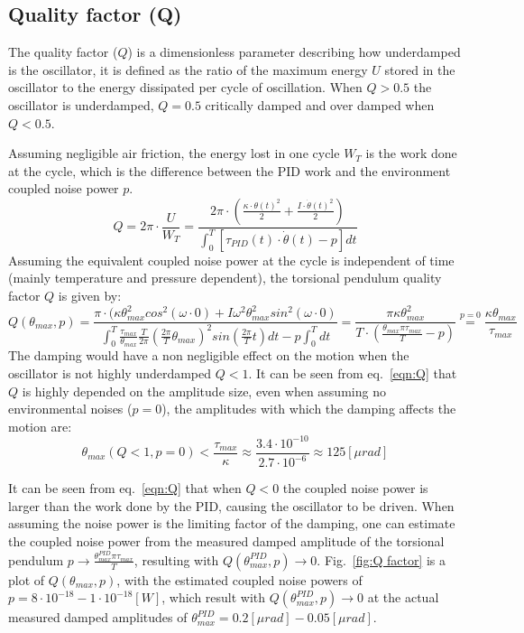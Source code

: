 \documentclass[\main/master.tex]{subfiles}
\begin{document}
\subsection{Quality factor (Q)}
The quality factor ($Q$) is a dimensionless parameter describing how underdamped is the oscillator, it is defined as the ratio of the maximum energy $U$ stored in the oscillator to the energy dissipated per cycle of oscillation. When $Q > 0.5$ the oscillator is underdamped, $Q = 0.5$ critically damped and over damped when $Q < 0.5$.
\par\noindent
Assuming negligible air friction, the energy lost in one cycle  $W_T$ is the work done at the cycle, which is the difference between the PID work and the environment coupled noise power $p$. 
\begin{equation}
Q = 2\pi\cdot \frac{U}{W_T}=  \frac{2\pi\cdot(\frac{\kappa\cdot\theta(t)^2}{2}+\frac{I\cdot\dot{\theta}(t)^2}{2})}{\int_0^T[\tau_{PID}(t)\cdot\dot{\theta}(t) - p]dt} 
\label{eqn:Q}
\end{equation}
Assuming the equivalent coupled noise power at the cycle is independent of time (mainly temperature and pressure dependent), the torsional pendulum quality factor $Q$ is given by:
\begin{equation}
Q(\theta_{max},p) =  \frac{\pi\cdot(\kappa\theta_{max}^2cos^2(\omega\cdot 0)+I\omega^2\theta_{max}^2sin^2(\omega\cdot 0) }{\int_0^T\frac{\tau_{max} }{\theta_{max}} \frac{ T}{2\pi}(\frac{2\pi}{T}\theta_{max})^2 sin(\frac{2\pi}{T}t)dt-p\int_0^T dt }  =  \frac{\pi\kappa\theta_{max}^2}{T\cdot(\frac{\theta_{max}\pi\tau_{max}}{T} -p)} \stackrel{p= 0}{=} \frac{\kappa\theta_{max}}{\tau_{max}}
\label{eqn:Q}
\end{equation}
The damping would have a non negligible effect on the motion when the oscillator is not highly underdamped $Q < 1$. It can be seen from eq.~\ref{eqn:Q} that $Q$ is highly depended on the amplitude size, even when assuming no environmental noises ($p=0$), the amplitudes with which the damping affects the motion are:  
\begin{equation}
\theta_{max}(Q<1,p=0) < \frac{\tau_{max}}{\kappa} \approx \frac{3.4\cdot 10^{-10}}{2.7\cdot 10^{-6}} \approx 125 [\mu rad]
\label{eqn:low Q}
\end{equation}

It can be seen from eq.~\ref{eqn:Q} that when $Q<0$ the coupled noise power is larger than the work done by the PID, causing the oscillator to be driven. When assuming the noise power is the limiting factor of the damping, one can estimate the coupled noise power from the measured damped amplitude of the torsional pendulum $p \rightarrow \frac{ \theta_{max}^{PID}\pi\tau_{max}}{T}$, resulting with $Q(\theta_{max}^{PID},p)	\rightarrow 0$. Fig.~\ref{fig:Q factor} is a plot of $Q(\theta_{max},p)$, with the estimated coupled noise powers  of $p= 8\cdot 10^{-18} - 1\cdot 10^{-18} [W]$, which result  with $Q(\theta_{max}^{PID},p) \rightarrow 0$ at the actual measured damped amplitudes of $\theta_{max}^{PID}= 0.2 [\mu rad] -0.05 [\mu rad]$.
\end{document}
